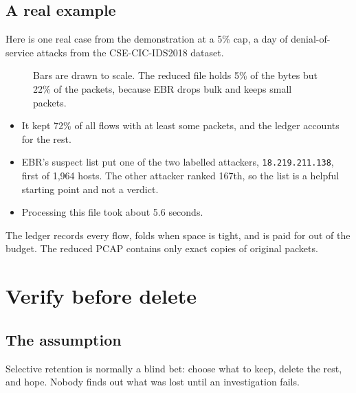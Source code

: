 \section{A real example}
Here is one real case from the demonstration at a 5\% cap, a day of denial-of-service attacks from the CSE-CIC-IDS2018 dataset.

\begin{figure}[H]
\centering
{}
\caption{Bars are drawn to scale. The reduced file holds 5\% of the bytes but 22\% of the packets, because EBR drops bulk and keeps small packets.}
\end{figure}

\begin{itemize}
\item It kept 72\% of all flows with at least some packets, and the ledger accounts for the rest.
\item EBR's suspect list put one of the two labelled attackers, \texttt{18.219.211.138}, first of 1,964 hosts. The other attacker ranked 167th, so the list is a helpful starting point and not a verdict.
\item Processing this file took about 5.6 seconds.
\end{itemize}

\begin{recap}
The ledger records every flow, folds when space is tight, and is paid for out of the budget. The reduced PCAP contains only exact copies of original packets.
\end{recap}

\chapter{Verify before delete}
\label{ch:verify}

\section{The assumption}
Selective retention is normally a blind bet: choose what to keep, delete the rest, and hope. Nobody finds out what was lost until an investigation fails.

